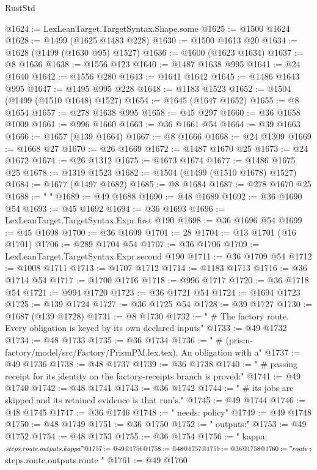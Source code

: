 \begin{lexlean}{RustStd}
\begin{coremodule}
@1624 := LexLeanTarget.TargetSyntax.Shape.some
@1625 := @1500 @1624
@1628 := @1499 (@1625 @1483 @228)
@1630 := @1500 @1613 @20
@1634 := @1628 (@1499 (@1630 @95) @1527)
@1636 := @1600 (@1623 @1634)
@1637 := @8 @1636
@1638 := @1556 @123
@1640 := @1487 @1638 @995
@1641 := @24 @1640
@1642 := @1556 @280
@1643 := @1641 @1642
@1645 := @1486 @1643 @995
@1647 := @1495 @995 @228
@1648 := @1183 @1523
@1652 := @1504 (@1499 (@1510 @1648) @1527)
@1654 := @1645 (@1647 @1652)
@1655 := @8 @1654
@1657 := @278 @1638 @995
@1658 := @45 @297
@1660 := @36 @1658 @1009
@1661 := @996 @1660
@1663 := @36 @1661 @54
@1664 := @39 @1663
@1666 := @1657 (@139 @1664)
@1667 := @8 @1666
@1668 := @24 @1309
@1669 := @1668 @27
@1670 := @26 @1669
@1672 := @1487 @1670 @25
@1673 := @24 @1672
@1674 := @26 @1312
@1675 := @1673 @1674
@1677 := @1486 @1675 @25
@1678 := @1319 @1523
@1682 := @1504 (@1499 (@1510 @1678) @1527)
@1684 := @1677 (@1497 @1682)
@1685 := @8 @1684
@1687 := @278 @1670 @25
@1688 := "            "
@1689 := @49 @1688
@1690 := @48 @1689
@1692 := @36 @1690 @54
@1693 := @45 @1692
@1694 := @36 @1693
@1696 := LexLeanTarget.TargetSyntax.Expr.first @190
@1698 := @36 @1696 @54
@1699 := @45 @1698
@1700 := @36 @1699
@1701 := 28
@1704 := @13 @1701 (@16 @1701)
@1706 := @289 @1704 @54
@1707 := @36 @1706
@1709 := LexLeanTarget.TargetSyntax.Expr.second @190
@1711 := @36 @1709 @54
@1712 := @1008 @1711
@1713 := @1707 @1712
@1714 := @1183 @1713
@1716 := @36 @1714 @54
@1717 := @1700 @1716
@1718 := @996 @1717
@1720 := @36 @1718 @54
@1721 := @994 @1720
@1723 := @36 @1721 @54
@1724 := @1694 @1723
@1725 := @139 @1724
@1727 := @36 @1725 @54
@1728 := @39 @1727
@1730 := @1687 (@139 @1728)
@1731 := @8 @1730
@1732 := "  # The factory route. Every obligation is keyed by its own declared inputs"
@1733 := @49 @1732
@1734 := @48 @1733
@1735 := @36 @1734
@1736 := "  # (prism-factory/model/src/Factory/PrismPM.lex.tex). An obligation with a"
@1737 := @49 @1736
@1738 := @48 @1737
@1739 := @36 @1738
@1740 := "  # passing receipt for its identity on the factory-receipts branch is proved:"
@1741 := @49 @1740
@1742 := @48 @1741
@1743 := @36 @1742
@1744 := "  # its jobs are skipped and its retained evidence is that run's."
@1745 := @49 @1744
@1746 := @48 @1745
@1747 := @36 @1746
@1748 := "    needs: policy"
@1749 := @49 @1748
@1750 := @48 @1749
@1751 := @36 @1750
@1752 := "    outputs:"
@1753 := @49 @1752
@1754 := @48 @1753
@1755 := @36 @1754
@1756 := "      kappa: ${{ steps.route.outputs.kappa }}"
@1757 := @49 @1756
@1758 := @48 @1757
@1759 := @36 @1758
@1760 := "      route: ${{ steps.route.outputs.route }}"
@1761 := @49 @1760

\end{coremodule}
\end{lexlean}
